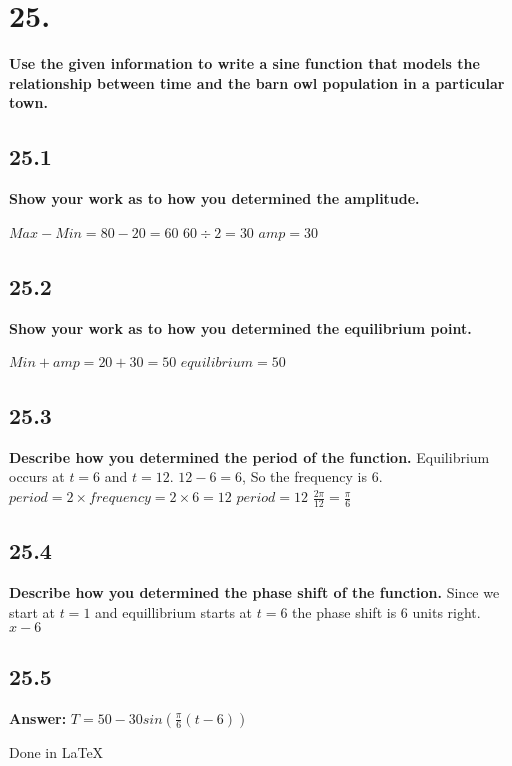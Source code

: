 \documentclass{article}%
\begin{document}
\section*{25.}
\textbf{Use the given information to write a sine function that models the relationship between time and the barn owl population in a particular town. }

\subsection*{25.1}
\textbf{Show your work as to how you determined the amplitude. \newline}

\begin{center}
$Max-Min=80-20=60$\newline
$60\div 2 = 30$\newline
$amp=30$\newline
\end{center}
\subsection*{25.2}
\textbf{Show your work as to how you determined the equilibrium point. \newline}
\begin{center}
$Min+amp = 20+30 = 50$ \newline
$equilibrium=50$\newline
\end{center}


\subsection*{25.3}
\textbf{Describe how you determined the period of the function. \newline}
Equilibrium occurs at $t=6$ and $t=12$. $12-6=6$, So the frequency is $6$. $period = 2\times frequency = 2\times 6= 12$
$period=12$
$\frac{2\pi}{12} = \frac{\pi}{6}$
\subsection*{25.4}
\textbf{Describe how you determined the phase shift of the function. \newline}
Since we start at $t=1$ and equillibrium starts at $t=6$ the phase shift is $6$ units right.
$x-6$
\subsection*{25.5}
\textbf{Answer: }
$T = 50-30sin(\frac{\pi}{6}(t-6))$

\vspace*{0.5in}
\noindent Done in LaTeX
\end{document}
